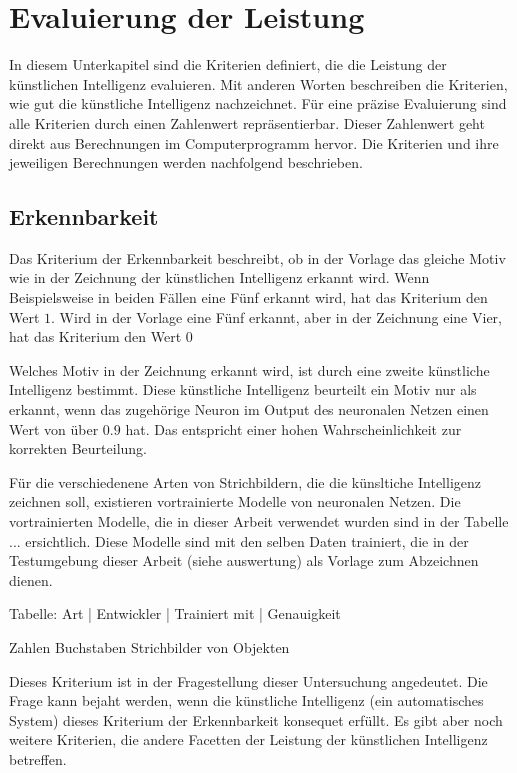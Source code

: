 \section{Evaluierung der Leistung}
In diesem Unterkapitel sind die Kriterien definiert, die die Leistung der
künstlichen Intelligenz evaluieren. Mit anderen Worten beschreiben die
Kriterien, wie gut die künstliche Intelligenz nachzeichnet. Für eine präzise
Evaluierung sind alle Kriterien durch einen Zahlenwert repräsentierbar. Dieser
Zahlenwert geht direkt aus Berechnungen im Computerprogramm hervor. Die
Kriterien und ihre jeweiligen Berechnungen werden nachfolgend beschrieben.

\subsection{Erkennbarkeit}
Das Kriterium der Erkennbarkeit beschreibt, ob in der Vorlage das gleiche Motiv
wie in der Zeichnung der künstlichen Intelligenz erkannt wird. Wenn
Beispielsweise in beiden Fällen eine Fünf erkannt wird, hat das Kriterium den
Wert $1$. Wird in der Vorlage eine Fünf erkannt, aber in der Zeichnung eine
Vier, hat das Kriterium den Wert $0$

Welches Motiv in der Zeichnung erkannt wird, ist durch eine zweite künstliche
Intelligenz bestimmt. Diese künstliche Intelligenz beurteilt ein Motiv nur als
erkannt, wenn das zugehörige Neuron im Output des neuronalen Netzen einen Wert
von über $0.9$ hat. Das entspricht einer hohen Wahrscheinlichkeit zur korrekten
Beurteilung.

Für die verschiedenene Arten von Strichbildern, die die künsltiche Intelligenz
zeichnen soll, existieren vortrainierte Modelle von neuronalen Netzen. Die
vortrainierten Modelle, die in dieser Arbeit verwendet wurden sind in der
Tabelle ... ersichtlich. Diese Modelle sind mit den selben Daten trainiert, die
in der Testumgebung dieser Arbeit (siehe auswertung) als Vorlage zum Abzeichnen
dienen. %

Tabelle:
Art       |       Entwickler      |     Trainiert mit     |      Genauigkeit 

Zahlen  
Buchstaben
Strichbilder von Objekten

Dieses Kriterium ist in der Fragestellung dieser Untersuchung angedeutet. Die
Frage kann bejaht werden, wenn die künstliche Intelligenz (ein automatisches
System) dieses Kriterium der Erkennbarkeit konsequet erfüllt. Es gibt aber noch
weitere Kriterien, die andere Facetten der Leistung der künstlichen Intelligenz
betreffen.

